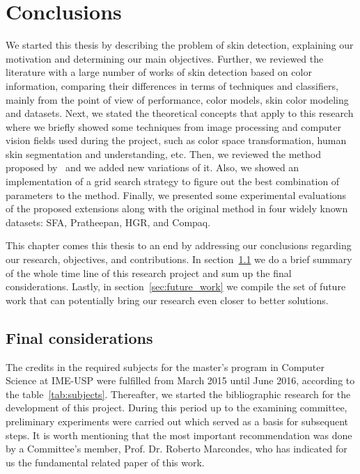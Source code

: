 \chapter{Conclusions}
\label{cap:conclusoes}

We started this thesis by describing the problem of skin detection, explaining our motivation and determining our main objectives. Further, we reviewed the literature with a large number of works of skin detection based on color information, comparing their differences in terms of techniques and classifiers, mainly from the point of view of performance, color models, skin color modeling and datasets. Next, we stated the theoretical concepts that apply to this research where we briefly showed some techniques from image processing and computer vision fields used during the project, such as color space transformation, human skin segmentation and understanding, etc. Then, we reviewed the method proposed by~\citet{brancati:17} and we added new variations of it. Also, we showed an implementation of a grid search strategy to figure out the best combination of parameters to the method. Finally, we presented some experimental evaluations of the proposed extensions along with the original method in four widely known datasets: SFA, Pratheepan, HGR, and Compaq.

This chapter comes this thesis to an end by addressing our conclusions regarding our research, objectives, and contributions. In section~\ref{sec:final_considerations} we do a brief summary of the whole time line of this research project and sum up the final considerations. Lastly, in section~\ref{sec:future_work} we compile the set of future work that can potentially bring our research even closer to better solutions.


\section{Final considerations}
\label{sec:final_considerations}
The credits in the required subjects for the master's program in Computer Science at IME-USP were fulfilled from March 2015 until June 2016, according to the table~\ref{tab:subjects}. Thereafter, we started the bibliographic research for the development of this project. During this period up to the examining committee, preliminary experiments were carried out which served as a basis for subsequent steps. It is worth mentioning that the most important recommendation was done by a Committee's member, Prof. Dr. Roberto Marcondes, who has indicated for us the fundamental related paper of this work.


